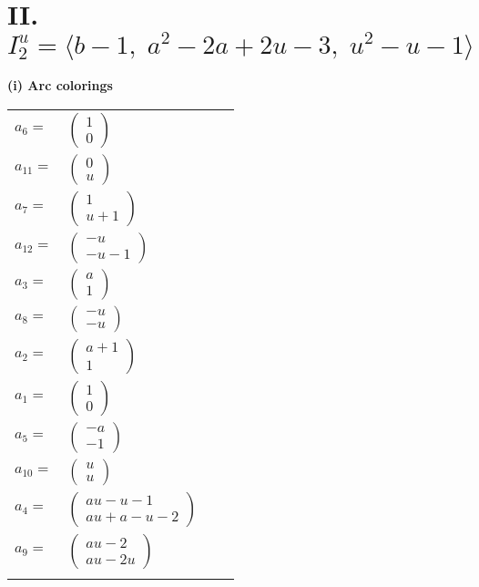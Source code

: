 \documentclass[1p]{elsarticle_modified}
\theoremstyle{definition}
\begin{document}
\centering \section*{II. $I^u_{2}= \langle b-1,\;a^2-2 a+2 u-3,\;u^2- u-1 \rangle$}
\flushleft \textbf{(i) Arc colorings}\\
\begin{tabular}{m{7pt} m{180pt} m{7pt} m{180pt} }
\flushright $a_{6}=$&$\begin{pmatrix}1\\0\end{pmatrix}$ \\
\flushright $a_{11}=$&$\begin{pmatrix}0\\u\end{pmatrix}$ \\
\flushright $a_{7}=$&$\begin{pmatrix}1\\u+1\end{pmatrix}$ \\
\flushright $a_{12}=$&$\begin{pmatrix}- u\\- u-1\end{pmatrix}$ \\
\flushright $a_{3}=$&$\begin{pmatrix}a\\1\end{pmatrix}$ \\
\flushright $a_{8}=$&$\begin{pmatrix}- u\\- u\end{pmatrix}$ \\
\flushright $a_{2}=$&$\begin{pmatrix}a+1\\1\end{pmatrix}$ \\
\flushright $a_{1}=$&$\begin{pmatrix}1\\0\end{pmatrix}$ \\
\flushright $a_{5}=$&$\begin{pmatrix}- a\\-1\end{pmatrix}$ \\
\flushright $a_{10}=$&$\begin{pmatrix}u\\u\end{pmatrix}$ \\
\flushright $a_{4}=$&$\begin{pmatrix}a u- u-1\\a u+a- u-2\end{pmatrix}$ \\
\flushright $a_{9}=$&$\begin{pmatrix}a u-2\\a u-2 u\end{pmatrix}$\\&\end{tabular}
\end{document}
